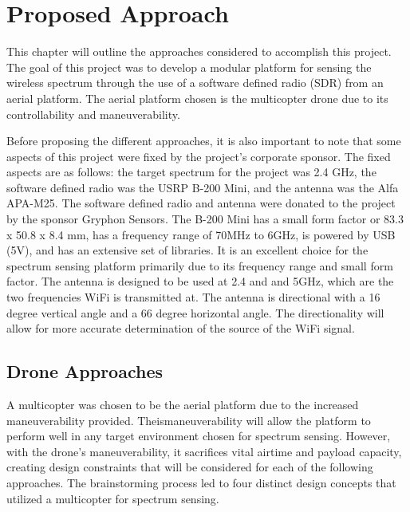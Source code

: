 \chapter{Proposed Approach}
This chapter will outline the approaches considered to accomplish this project. The goal of this project was to develop a modular platform for sensing the wireless spectrum through the use of a software defined radio (SDR) from an aerial platform. The aerial platform chosen is the multicopter drone due to its controllability and maneuverability. \par

Before proposing the different approaches, it is also important to note that some aspects of this project were fixed by the project’s corporate sponsor. The fixed aspects are as follows: the target spectrum for the project was 2.4 GHz, the software defined radio was the USRP B-200 Mini, and the antenna was the Alfa APA-M25. The software defined radio and antenna were donated to the project by the sponsor Gryphon Sensors. The B-200 Mini has a small form factor or 83.3 x 50.8 x 8.4 mm, has a frequency range of 70MHz to 6GHz, is powered by USB (5V), and has an extensive set of libraries. It is an excellent choice for the spectrum sensing platform primarily due to its frequency range and small form factor. The antenna is designed to be used at 2.4 and and 5GHz, which are the two frequencies WiFi is transmitted at. The antenna is directional with a 16 degree vertical angle and a 66 degree horizontal angle. The directionality will allow for more accurate determination of the source of the WiFi signal.

\section{Drone Approaches}
A multicopter was chosen to be the aerial platform due to the increased maneuverability provided. Theismaneuverability will allow the platform to perform well in any target environment chosen for spectrum sensing. However, with the drone’s maneuverability, it sacrifices vital airtime and payload capacity, creating design constraints that will be considered for each of the following approaches. The brainstorming process led to four distinct design concepts that utilized a multicopter for spectrum sensing. \par

